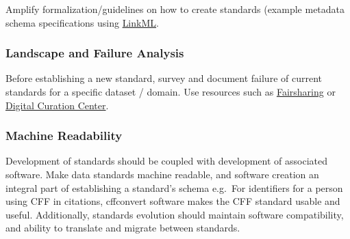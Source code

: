 \documentclass[
  letterpaper,
  DIV=11,
  numbers=noendperiod]{scrartcl}
\begin{document}
Amplify formalization/guidelines on how to create standards (example
metadata schema specifications using \href{https://linkml.io}{LinkML}.

\subsubsection{Landscape and Failure
Analysis}\label{landscape-and-failure-analysis}

Before establishing a new standard, survey and document failure of
current standards for a specific dataset / domain. Use resources such as
\href{https://fairsharing.org/}{Fairsharing} or
\href{https://www.dcc.ac.uk/guidance/standards}{Digital Curation
Center}.

\subsubsection{Machine Readability}\label{machine-readability}

Development of standards should be coupled with development of
associated software. Make data standards machine readable, and software
creation an integral part of establishing a standard's schema e.g.~For
identifiers for a person using CFF in citations, cffconvert software
makes the CFF standard usable and useful. Additionally, standards
evolution should maintain software compatibility, and ability to
translate and migrate between standards.
\end{document}
